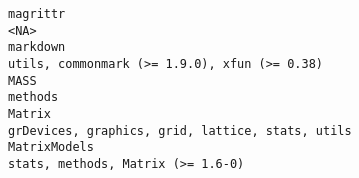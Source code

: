 \documentclass[
  letterpaper,
  DIV=11,
  numbers=noendperiod]{scrreprt}
\begin{document}
\begin{verbatim}
magrittr                                                                                                                                                                                                                                                                                                                                                                                                                                                                                                                                                                                                              <NA>
markdown                                                                                                                                                                                                                                                                                                                                                                                                                                                                                                                                                                      utils, commonmark (>= 1.9.0), xfun (>= 0.38)
MASS                                                                                                                                                                                                                                                                                                                                                                                                                                                                                                                                                                                                               methods
Matrix                                                                                                                                                                                                                                                                                                                                                                                                                                                                                                                                                                    grDevices, graphics, grid, lattice, stats, utils
MatrixModels                                                                                                                                                                                                                                                                                                                                                                                                                                                                                                                                                                             stats, methods, Matrix (>= 1.6-0)

\end{verbatim}
\end{document}
